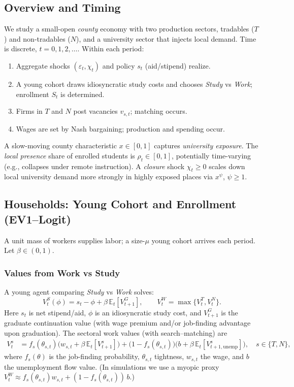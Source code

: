 \subsection*{Overview and Timing}
We study a small-open \textit{county} economy with two production sectors, tradables ($T$) and non-tradables ($N$), and a university sector that injects local demand. Time is discrete, $t=0,1,2,\dots$. Within each period:
\begin{enumerate}
	\item Aggregate shocks $(\varepsilon_t,\chi_t)$ and policy $s_t$ (aid/stipend) realize.
	\item A young cohort draws idiosyncratic study costs and chooses \textit{Study} vs \textit{Work}; enrollment $S_t$ is determined.
	\item Firms in $T$ and $N$ post vacancies $v_{s,t}$; matching occurs.
	\item Wages are set by Nash bargaining; production and spending occur.
\end{enumerate}
A slow-moving county characteristic $x\in[0,1]$ captures \textit{university exposure}. The \textit{local presence} share of enrolled students is $\rho_t\in[0,1]$, potentially time-varying (e.g., collapses under remote instruction). A \textit{closure} shock $\chi_t\ge 0$ scales down local university demand more strongly in highly exposed places via $x^\psi$, $\psi\ge 1$.

\subsection*{Households: Young Cohort and Enrollment (EV1–Logit)}
A unit mass of workers supplies labor; a size-$\mu$ young cohort arrives each period. Let $\beta\in(0,1)$.

\subsubsection*{Values from Work vs Study}
A young agent comparing \textit{Study} vs \textit{Work} solves:
\[
V^S_t(\phi)=s_t-\phi+\beta\,\mathbb{E}_t[V^G_{t+1}],
\qquad
V^W_t=\max\{V^T_t,V^N_t\}.
\]
Here $s_t$ is net stipend/aid, $\phi$ is an idiosyncratic study cost, and $V^G_{t+1}$ is the graduate continuation value (with wage premium and/or job-finding advantage upon graduation). The sectoral work values (with search–matching) are
\begin{align}
	V^s_t
	&= f_s(\theta_{s,t})\big(w_{s,t} + \beta\,\mathbb{E}_t[V^s_{t+1}]\big)
	+ \big(1-f_s(\theta_{s,t})\big)\big(b + \beta\,\mathbb{E}_t[V^s_{t+1,\text{unemp}}]\big),\quad s\in\{T,N\},
\end{align}
where $f_s(\theta)$ is the job-finding probability, $\theta_{s,t}$ tightness, $w_{s,t}$ the wage, and $b$ the unemployment flow value. (In simulations we use a myopic proxy $V^W_t\approx f_s(\theta_{s,t})w_{s,t}+(1-f_s(\theta_{s,t}))\,b$.)

